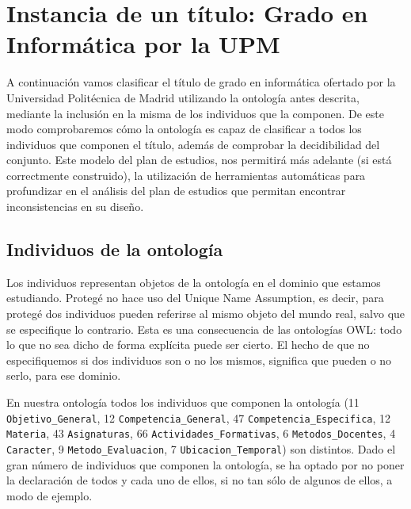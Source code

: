 	 
	

\section{Instancia de un título: Grado en Informática por la UPM}
A continuación vamos clasificar el título de grado en informática ofertado por la Universidad Politécnica de Madrid utilizando la ontología antes descrita, mediante la inclusión en la misma de los individuos que la componen. De este modo comprobaremos cómo la ontología es capaz de clasificar a todos los individuos que componen el título, además de comprobar la decidibilidad del conjunto. Este modelo del plan de estudios, nos permitirá más adelante (si está correctmente construido), la utilización de herramientas automáticas para profundizar en el análisis del plan de estudios que permitan encontrar inconsistencias en su diseño. 


\subsection{Individuos de la ontología}
	Los individuos representan objetos de la ontología en el dominio que estamos estudiando. Protegé no hace uso del Unique Name Assumption, es decir, para protegé dos individuos pueden referirse al mismo objeto del mundo real, salvo que se especifique lo contrario. Esta es una consecuencia de las ontologías OWL: todo lo que no sea dicho de forma explícita puede ser cierto. El hecho de que no especifiquemos si dos individuos son o no los mismos, significa que pueden o no serlo, para ese dominio. 
  
	En nuestra ontología todos los individuos que componen la ontología (11 \lstinline!Objetivo_General!, 12 \lstinline!Competencia_General!, 47 \lstinline!Competencia_Especifica!, 12 \lstinline!Materia!, 43 \lstinline!Asignaturas!, 66 \lstinline!Actividades_Formativas!, 6 \lstinline!Metodos_Docentes!, 4 \lstinline!Caracter!, 9 \lstinline!Metodo_Evaluacion!, 7 \lstinline!Ubicacion_Temporal!) son distintos. Dado el gran número de individuos que componen la ontología, se ha optado por no poner la declaración de todos y cada uno de ellos, si no tan sólo de algunos de ellos, a modo de ejemplo.
 
  
